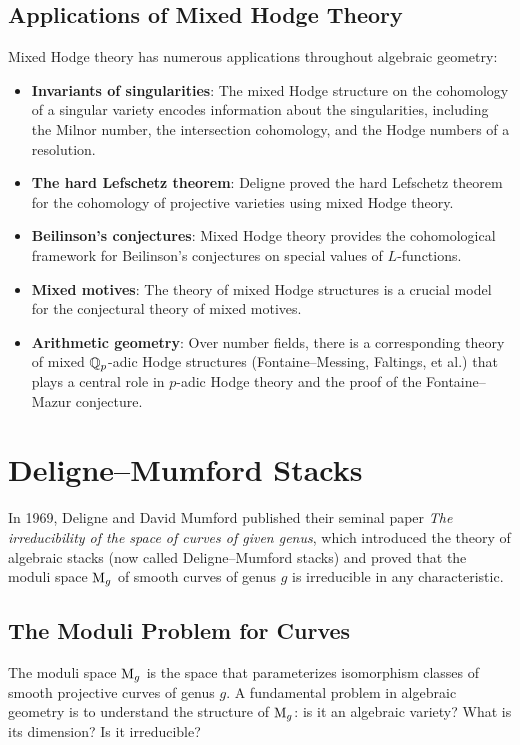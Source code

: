 \subsection{Applications of Mixed Hodge Theory}

Mixed Hodge theory has numerous applications throughout algebraic geometry:
\begin{itemize}
    \item \textbf{Invariants of singularities}: The mixed Hodge structure on the cohomology of a singular variety encodes information about the singularities, including the Milnor number, the intersection cohomology, and the Hodge numbers of a resolution.
    \item \textbf{The hard Lefschetz theorem}: Deligne proved the hard Lefschetz theorem for the cohomology of projective varieties using mixed Hodge theory.
    \item \textbf{Beilinson's conjectures}: Mixed Hodge theory provides the cohomological framework for Beilinson's conjectures on special values of \(L\)-functions.
    \item \textbf{Mixed motives}: The theory of mixed Hodge structures is a crucial model for the conjectural theory of mixed motives.
    \item \textbf{Arithmetic geometry}: Over number fields, there is a corresponding theory of mixed \(\mathbb{Q}_p\)-adic Hodge structures (Fontaine--Messing, Faltings, et al.) that plays a central role in \(p\)-adic Hodge theory and the proof of the Fontaine--Mazur conjecture.
\end{itemize}

\section{Deligne--Mumford Stacks}

In 1969, Deligne and David Mumford published their seminal paper \textit{The irreducibility of the space of curves of given genus}, which introduced the theory of algebraic stacks (now called Deligne--Mumford stacks) and proved that the moduli space \(\operatorname{M}_g\) of smooth curves of genus \(g\) is irreducible in any characteristic.

\subsection{The Moduli Problem for Curves}

The moduli space \(\operatorname{M}_g\) is the space that parameterizes isomorphism classes of smooth projective curves of genus \(g\). A fundamental problem in algebraic geometry is to understand the structure of \(\operatorname{M}_g\): is it an algebraic variety? What is its dimension? Is it irreducible?

